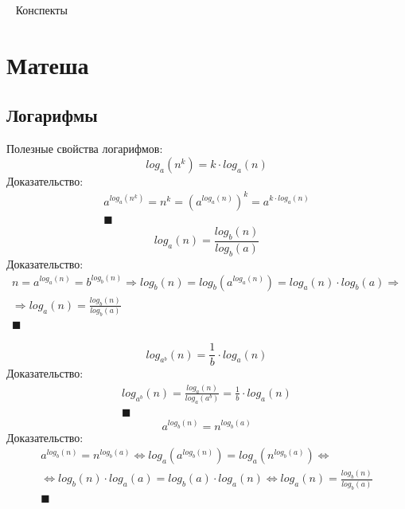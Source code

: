 \documentclass[a4paper,12pt]{article}
\begin{document}
	\
	\vfil
	\hfil Конспекты \hfil
	\vfil
	
	\newpage
	\tableofcontents
	
	\newpage
	\section{Матеша}
	\subsection{Логарифмы}
	Полезные свойства логарифмов:
	\begin{equation}
	\boxed{
		log_a(n^k) = k \cdot log_a(n)
	}
	\end{equation}
	Доказательство:
	\begin{eqnarray}
		a^{log_a(n^k)} = n^k = (a^{log_a(n)})^k = a^{k\cdot log_a(n)} \\ \blacksquare
	\end{eqnarray}
	\begin{equation}
	\boxed{
		log_a(n) = \frac{log_b(n)}{log_b(a)}
	}
	\end{equation}
	Доказательство:
	\begin{eqnarray}
		n = a^{log_a(n)} = b^{log_b(n)} \Rightarrow log_b(n) = log_b(a^{log_a(n)}) = log_a(n)\cdot log_b(a) \Rightarrow \\ \Rightarrow log_a(n) = \frac{log_b(n)}{log_b(a)} \\ \blacksquare
	\end{eqnarray}
	
	\begin{equation}
		\boxed{
			log_{a^b}(n) = \frac{1}{b} \cdot log_a(n)
		}
	\end{equation}
	Доказательство:
	\begin{eqnarray}
		log_{a^b}(n) = \frac{log_{a}(n)}{log_a(a^b)} = \frac{1}{b} \cdot log_a(n) \\ \blacksquare
	\end{eqnarray}
	\begin{equation}
		\boxed{
			a^{log_b(n)} = n^{log_b(a)}	
		}
	\end{equation}
	Доказательство:
	\begin{eqnarray}
		a^{log_b(n)} = n^{log_b(a)}	\Leftrightarrow log_a(a^{log_b(n)}) = log_a(n^{log_b(a)}) \Leftrightarrow \\ \Leftrightarrow log_b(n) \cdot log_a(a) = log_b(a) \cdot log_a(n) \Leftrightarrow log_a(n) = \frac{log_b(n)}{log_b(a)} \\ \blacksquare
	\end{eqnarray}
	
\end{document}
